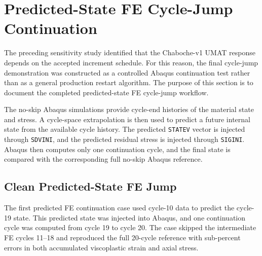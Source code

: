 \section{Predicted-State FE Cycle-Jump Continuation}

The preceding sensitivity study identified that the Chaboche-v1 UMAT response depends on the accepted increment schedule. For this reason, the final cycle-jump demonstration was constructed as a controlled Abaqus continuation test rather than as a general production restart algorithm. The purpose of this section is to document the completed predicted-state FE cycle-jump workflow.

The no-skip Abaqus simulations provide cycle-end histories of the material state and stress. A cycle-space extrapolation is then used to predict a future internal state from the available cycle history. The predicted \texttt{STATEV} vector is injected through \texttt{SDVINI}, and the predicted residual stress is injected through \texttt{SIGINI}. Abaqus then computes only one continuation cycle, and the final state is compared with the corresponding full no-skip Abaqus reference.

\subsection{Clean Predicted-State FE Jump}

The first predicted FE continuation case used cycle-10 data to predict the cycle-19 state. This predicted state was injected into Abaqus, and one continuation cycle was computed from cycle 19 to cycle 20. The case skipped the intermediate FE cycles 11--18 and reproduced the full 20-cycle reference with sub-percent errors in both accumulated viscoplastic strain and axial stress.

\begin{table}[htbp]
\centering
\small
{}
\caption{Stage 5B predicted-state FE cycle-jump result. The predicted cycle-19 state was injected with \texttt{SDVINI}/\texttt{SIGINI} and continued for one computed cycle.}
\label{tab:stage5b_predicted_fe_jump}
\end{table}

